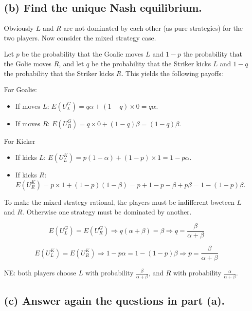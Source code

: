 \documentclass{article}
\begin{document}
\subsection*{(b) Find the unique Nash equilibrium.}

\begin{mdframed}[backgroundcolor=blue!20,linecolor=white]
Obviously $L$ and $R$ are not dominated by each other (as pure strategies) for the two players. Now consider the 
mixed strategy case.
\end{mdframed}

Let $p$ be the probability that the Goalie moves $L$ and $1-p$ the probability that the Golie moves $R$, and let $q$ be the probability that the Striker kicks $L$ and $1-q$ the probability that the Striker kicks $R$. This yields the following payoffs:

\newpage

For Goalie:
\begin{itemize}
\item If moves $L$: $E(U^G_L)= q \alpha + (1-q) \times 0 = q \alpha$.
\item If moves $R$: $E(U^G_R)=q \times 0 + (1-q) \beta =(1-q) \beta$.
\end{itemize}

For Kicker
\begin{itemize}
\item If kicks $L$: $E(U^K_L) = p (1-\alpha) + (1-p)\times 1 = 1 - p\alpha$.
\item If kicks $R$: $E(U^K_R) = p\times 1 + (1-p)(1-\beta) = p + 1 - p - \beta + p\beta = 1 - (1-p)\beta$.
\end{itemize}

\begin{mdframed}[backgroundcolor=blue!20,linecolor=white]
To make the mixed strategy rational, the players must be indifferent bweteen $L$ and $R$. Otherwise one strategy must be
dominated by another.
\end{mdframed}


$$E(U^G_L) = E(U^G_R) \Rightarrow  q(\alpha+\beta) = \beta \Rightarrow q=\frac{\beta}{\alpha+\beta}$$
 
$$E(U^K_L) = E(U^K_R) \Rightarrow 1- p\alpha = 1-(1-p)\beta \Rightarrow p = \frac{\beta}{\alpha+\beta}$$

 
NE: both players choose $L$ with probability $\tfrac{\beta}{\alpha + \beta}$, and $R$ with probability $\tfrac{\alpha}{\alpha + \beta}$. 

   
\subsection*{(c) Answer again the questions in part (a).}
\end{document}
